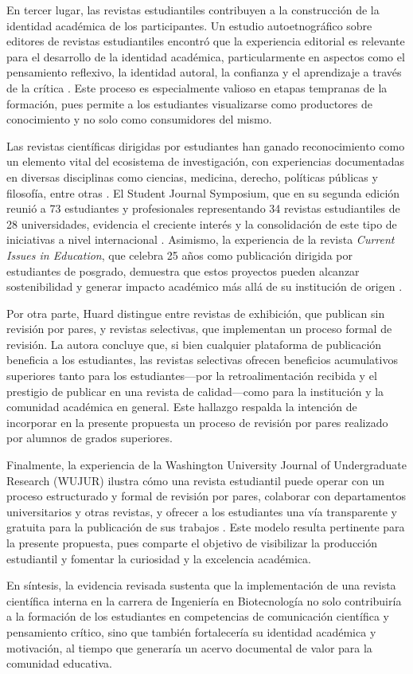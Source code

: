 En tercer lugar, las revistas estudiantiles contribuyen a la construcción de la identidad académica de los participantes. Un estudio autoetnográfico sobre editores de revistas estudiantiles encontró que la experiencia editorial es relevante para el desarrollo de la identidad académica, particularmente en aspectos como el pensamiento reflexivo, la identidad autoral, la confianza y el aprendizaje a través de la crítica \citep{lujano2024exploring}. Este proceso es especialmente valioso en etapas tempranas de la formación, pues permite a los estudiantes visualizarse como productores de conocimiento y no solo como consumidores del mismo.

Las revistas científicas dirigidas por estudiantes han ganado reconocimiento como un elemento vital del ecosistema de investigación, con experiencias documentadas en diversas disciplinas como ciencias, medicina, derecho, políticas públicas y filosofía, entre otras \citep{warren2025vital}. El Student Journal Symposium, que en su segunda edición reunió a 73 estudiantes y profesionales representando 34 revistas estudiantiles de 28 universidades, evidencia el creciente interés y la consolidación de este tipo de iniciativas a nivel internacional \citep{warren2025vital}. Asimismo, la experiencia de la revista \textit{Current Issues in Education}, que celebra 25 años como publicación dirigida por estudiantes de posgrado, demuestra que estos proyectos pueden alcanzar sostenibilidad y generar impacto académico más allá de su institución de origen \citep{lujano2023special}.

Por otra parte, Huard \citep{huard2019showcase} distingue entre revistas de exhibición, que publican sin revisión por pares, y revistas selectivas, que implementan un proceso formal de revisión. La autora concluye que, si bien cualquier plataforma de publicación beneficia a los estudiantes, las revistas selectivas ofrecen beneficios acumulativos superiores tanto para los estudiantes—por la retroalimentación recibida y el prestigio de publicar en una revista de calidad—como para la institución y la comunidad académica en general. Este hallazgo respalda la intención de incorporar en la presente propuesta un proceso de revisión por pares realizado por alumnos de grados superiores.

Finalmente, la experiencia de la Washington University Journal of Undergraduate Research (WUJUR) ilustra cómo una revista estudiantil puede operar con un proceso estructurado y formal de revisión por pares, colaborar con departamentos universitarios y otras revistas, y ofrecer a los estudiantes una vía transparente y gratuita para la publicación de sus trabajos \citep{wujur2024mission}. Este modelo resulta pertinente para la presente propuesta, pues comparte el objetivo de visibilizar la producción estudiantil y fomentar la curiosidad y la excelencia académica.

En síntesis, la evidencia revisada sustenta que la implementación de una revista científica interna en la carrera de Ingeniería en Biotecnología no solo contribuiría a la formación de los estudiantes en competencias de comunicación científica y pensamiento crítico, sino que también fortalecería su identidad académica y motivación, al tiempo que generaría un acervo documental de valor para la comunidad educativa.
